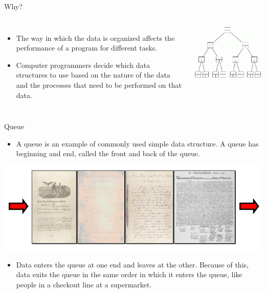 \documentclass{beamer}
\begin{document}
\begin{frame}{Why?}
\begin{columns}[c]
\begin{itemize}
\item The way in which the data is organized affects the performance of a program for different tasks. 
\item Computer programmers decide which data structures to use based on the nature of the data and the processes that need to be performed on that data.
\end{itemize}
\includegraphics[width=1.0\textwidth]{../imgs/binary-tree.png}
\end{columns}
\end{frame}

\begin{frame} {Queue}
\begin{itemize}
\item A queue is an example of commonly used simple data structure.  A queue has beginning and end, called the front and back of the queue. 
\end{itemize}
\includegraphics[width=1.0\textwidth]{../imgs/queue.png}
\begin{itemize}
\item Data enters the queue at one end and leaves at the other. Because of this, data exits the queue in the same order in which it enters the queue, like people in a checkout line at a supermarket.
\end{itemize}
\end{frame}
\end{document}
